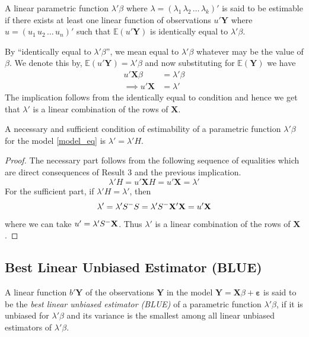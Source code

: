 \documentclass[10pt, a4paper]{article}
\begin{document}
\begin{definition}
A linear parametric function \( \lambda' \beta \) where \( \lambda = (\lambda_{1}\, \lambda_{2}\, \dots\, \lambda_{k})' \) is said to be estimable if there exists at least one linear function of observations \( u'\mathbf{Y} \) where \( u = (u_{1}\, u_{2}\, \dots\, u_{n})' \) such that \( \mathbb{E}(u'\mathbf{Y}) \) is identically equal to \( \lambda' \beta \).
\end{definition}


By ``identically equal to \( \lambda' \beta \)'', we mean equal to \( \lambda' \beta \) whatever may be the value of \( \beta \). We denote this by, \( \mathbb{E}(u'\mathbf{Y}) = \lambda' \beta \) and now substituting for \( \mathbb{E}(\mathbf{Y}) \) we have
\begin{align*}
	u'\mathbf{X}\beta &= \lambda' \beta \\
	\implies u'\mathbf{X} &= \lambda'
\end{align*}
The implication follows from the identically equal to condition and hence we get that \( \lambda' \) is a linear combination of the rows of \( \mathbf{X} \).

\begin{theorem}
	A necessary and sufficient condition of estimability of a parametric function \( \lambda' \beta \) for the model \eqref{model_eq} is \( \lambda' = \lambda'H \).
\end{theorem}
\begin{proof}
	The necessary part follows from the following sequence of equalities which are direct consequences of Result 3 and the previous implication.
	\[ \lambda'H = u'\mathbf{X}H = u'\mathbf{X} = \lambda' \]
	For the sufficient part, if \( \lambda'H = \lambda' \), then 
	\[ \lambda' = \lambda' S^{-}S = \lambda' S^{-} \mathbf{X}'\mathbf{X} = u'\mathbf{X} \] where we can take \( u' = \lambda' S^{-} \mathbf{X} \).
	Thus \( \lambda' \) is a linear combination of the rows of \( \mathbf{X} \).
\end{proof}

\subsection{Best Linear Unbiased Estimator (BLUE)}
\begin{definition}
A linear function \( b'\mathbf{Y} \) of the observations \( \mathbf{Y} \) in the model \( \mathbf{Y} = \mathbf{X}\beta + \mathbf{\varepsilon} \) is said to be the \textit{best linear unbiased estimator (BLUE)} of a parametric function \( \lambda' \beta \), if it is unbiased for \( \lambda' \beta \) and its variance is the smallest among all linear unbiased estimators of \( \lambda' \beta \).
\end{definition}
\end{document}
